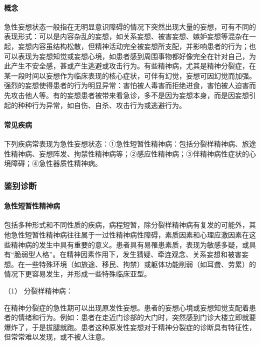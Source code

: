 \paragraph{概念}

急性妄想状态一般指在无明显意识障碍的情况下突然出现大量的妄想，可有不同的表现形式：可以是内容杂乱的妄想，如关系妄想、被害妄想、嫉妒妄想等混杂在一起，妄想内容虽结构松散，但精神活动完全被妄想所支配，并影响患者的行为；也可以表现为妄想知觉或妄想心境，如患者感到周围事物都好像完全在针对自己，为此产生不安全感，甚或产生逃避或攻击行为。有些精神病，尤其是精神分裂症，在某一段时间以妄想作为临床表现的核心症状，可伴有幻觉，妄想可因幻觉而加强。强烈的妄想使得患者的行为明显异常：害怕被人毒害而拒绝进食，害怕被人迫害而先攻击他人等。有的妄想患者被带来看急诊，多不是因为妄想本身，而是因妄想引起的种种行为异常，如自伤、自杀、攻击行为或逃避行为。

\paragraph{常见疾病}

下列疾病常表现为急性妄想状态：①急性短暂性精神病：包括分裂样精神病、旅途性精神病、妄想阵发、拘禁性精神病等；②感应性精神病；③伴精神病性症状的心境障碍；④急性器质性精神病。

\subsubsection{鉴别诊断}

\paragraph{急性短暂性精神病}

包括多种形式和不同性质的疾病，病程短暂，除分裂样精神病有复发的可能外，其他急性短暂性精神病往往属于一过性精神病性障碍，素质因素和心理应激因素在这些精神病的发生中具有重要的意义。患者具有易罹患素质，表现为敏感多疑，或具有“脆弱型人格”。在精神因素作用下，发生猜疑、牵连观念、关系妄想和被害妄想。在一些特殊环境（如旅途、移民、拘禁）或躯体功能削弱（如耳聋、劳累）的情况下更容易发生，并形成一些特殊临床亚型。

\hypertarget{text00049.htmlux5cux23CHP1-18-7-2-1-1}{}
（1） 分裂样精神病：

在精神分裂症的急性期可以出现原发性妄想。患者的妄想心境或妄想知觉支配着患者的情绪和行为。例如：患者在走近门诊部的大门时，突然感到门诊大楼立即就要爆炸了，于是拔腿就跑。患者这种原发性妄想对于精神分裂症的诊断具有特征性，但常常难以发现，或不被人注意。


